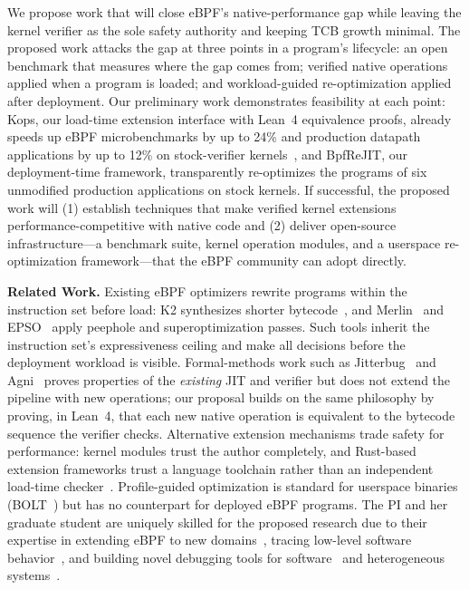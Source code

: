 We propose work that will close eBPF's native-performance gap while leaving the kernel verifier as the sole safety authority and keeping TCB growth minimal.  The proposed work attacks the gap at three points in a program's lifecycle: an open benchmark that measures where the gap comes from; verified native operations applied when a program is loaded; and workload-guided re-optimization applied after deployment.  Our preliminary work demonstrates feasibility at each point: Kops, our load-time extension interface with Lean~4 equivalence proofs, already speeds up eBPF microbenchmarks by up to 24\% and production datapath applications by up to 12\% on stock-verifier kernels~\cite{zheng2026kops}, and BpfReJIT, our deployment-time framework, transparently re-optimizes the programs of six unmodified production applications on stock kernels.  If successful, the proposed work will (1) establish techniques that make verified kernel extensions performance-competitive with native code and (2) deliver open-source infrastructure---a benchmark suite, kernel operation modules, and a userspace re-optimization framework---that the eBPF community can adopt directly.

\noindent \textbf{Related Work.}
Existing eBPF optimizers rewrite programs within the instruction set before load: K2 synthesizes shorter bytecode~\cite{xu2021synthesizing}, and Merlin~\cite{mao2024merlin} and EPSO~\cite{zhu2025epso} apply peephole and superoptimization passes.  Such tools inherit the instruction set's expressiveness ceiling and make all decisions before the deployment workload is visible.  Formal-methods work such as Jitterbug~\cite{nelson2020specification} and Agni~\cite{vishwanathan2023verifying} proves properties of the \textit{existing} JIT and verifier but does not extend the pipeline with new operations; our proposal builds on the same philosophy by proving, in Lean~4, that each new native operation is equivalent to the bytecode sequence the verifier checks.  Alternative extension mechanisms trade safety for performance: kernel modules trust the author completely, and Rust-based extension frameworks trust a language toolchain rather than an independent load-time checker~\cite{jia2025rex}.  Profile-guided optimization is standard for userspace binaries (\eg BOLT~\cite{panchenko2019bolt}) but has no counterpart for deployed eBPF programs.  The PI and her graduate student are uniquely skilled for the proposed research due to their expertise in extending eBPF to new domains~\cite{zheng2025extending,yang2025egpu}, tracing low-level software behavior~\cite{Quinn_2018_sledgehammer}, and building novel debugging tools for software~\cite{Quinn_2022_omnitable} and heterogeneous systems~\cite{Ma_2022_bnw}.

